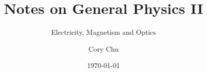 \documentclass{gwbook}
\title{Notes on General Physics II}
\subtitle{Electricity, Magnetism and Optics}
\author{Cory Chu}
\date{\today}
\begin{document}
\frontmatter
\maketitle
\tableofcontents


\mainmatter

\appendix


\backmatter
\bookbib
\end{document}
